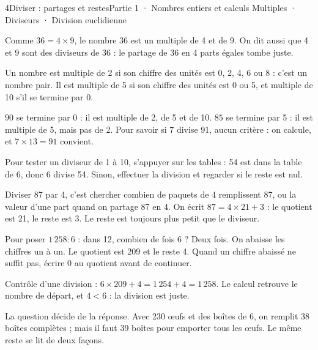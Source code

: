 \begin{ouverture}[calcul]{4}{Diviser : partages et restes}{Partie 1 · Nombres entiers et calculs}
{Multiples · Diviseurs · Division euclidienne}
\end{ouverture}
\pagestyle{otMain}\essentiel\fontsize{11}{15}\selectfont
{}\label{cours-4-1}
\begin{definition}Comme $36=4\times9$, le nombre 36 est un multiple de 4 et de 9. On dit aussi que 4 et 9 sont des diviseurs de 36 : le partage de 36 en 4 parts égales tombe juste.\end{definition}
\begin{propriete}Un nombre est multiple de 2 si son chiffre des unités est 0, 2, 4, 6 ou 8 : c’est un nombre pair. Il est multiple de 5 si son chiffre des unités est 0 ou 5, et multiple de 10 s’il se termine par 0.\end{propriete}
\begin{exemple}$90$ se termine par 0 : il est multiple de 2, de 5 et de 10. $85$ se termine par 5 : il est multiple de 5, mais pas de 2. Pour savoir si 7 divise 91, aucun critère : on calcule, et $7\times13=91$ convient.\end{exemple}
\begin{savoirfaire}Pour tester un diviseur de 1 à 10, s’appuyer sur les tables : 54 est dans la table de 6, donc 6 divise 54. Sinon, effectuer la division et regarder si le reste est nul.\end{savoirfaire}
\clearpage
{}\label{cours-4-2}
\begin{definition}Diviser 87 par 4, c’est chercher combien de paquets de 4 remplissent 87, ou la valeur d’une part quand on partage 87 en 4. On écrit $87=4\times21+3$ : le quotient est 21, le reste est 3. Le reste est toujours plus petit que le diviseur.\end{definition}
\begin{savoirfaire}Pour poser $1\,258:6$ : dans 12, combien de fois 6 ? Deux fois. On abaisse les chiffres un à un. Le quotient est 209 et le reste 4. Quand un chiffre abaissé ne suffit pas, écrire 0 au quotient avant de continuer.\end{savoirfaire}
\begin{exemple}Contrôle d’une division : $6\times209+4=1\,254+4=1\,258$. Le calcul retrouve le nombre de départ, et $4<6$ : la division est juste.\end{exemple}
\begin{attention}La question décide de la réponse. Avec 230 œufs et des boîtes de 6, on remplit 38 boîtes complètes ; mais il faut 39 boîtes pour emporter tous les œufs. Le même reste se lit de deux façons.\end{attention}

